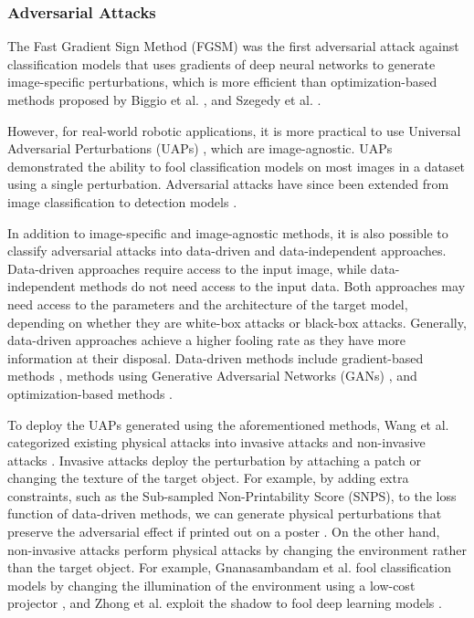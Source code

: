 \subsubsection{Adversarial Attacks}

 The Fast Gradient Sign Method (FGSM) \citep{GoodfellowSS14} was the first adversarial attack against classification models that uses gradients of deep neural networks to generate image-specific perturbations, which is more efficient than optimization-based methods proposed by Biggio et al. \citep{biggio2013evasion}, and Szegedy et al. \citep{szegedy2013intriguing}. 

However, for real-world robotic applications, it is more practical to use Universal Adversarial Perturbations (UAPs) \citep{moosavi2017universal, li2021universal, han2023driving}, which are image-agnostic. UAPs demonstrated the ability to fool classification models on most images in a dataset using a single perturbation. Adversarial attacks have since been extended from image classification to detection models \citep{gurbaxani2018traits, han2023detection}.

In addition to image-specific and image-agnostic methods, it is also possible to classify adversarial attacks into data-driven and data-independent approaches.  Data-driven approaches require access to the input image, while data-independent methods do not need access to the input data. Both approaches may need access to the parameters and the architecture of the target model, depending on whether they are white-box attacks or black-box attacks.  Generally, data-driven approaches achieve a higher fooling rate as they have more information at their disposal. Data-driven methods include gradient-based methods \citep{chow2020adversarial,li2021universal, xie2017adversarial, han2023detection}, methods using Generative Adversarial Networks (GANs) \citep{hashemi2020transferable,Wei2019}, and optimization-based methods \citep{carlini2017towards,liao2021transferable}. 

To deploy the UAPs generated using the aforementioned methods, Wang et al. categorized existing physical attacks into invasive attacks and
non-invasive attacks \citep{wang2022survey}. Invasive attacks deploy the perturbation by attaching a patch \citep{lee2019physical, xu2020adversarial, hu2021naturalistic, thys2019fooling} or changing the texture \citep{wang2021dual, wang2022fca} of the target object. For example, by adding extra constraints, such as the Sub-sampled Non-Printability Score (SNPS), to the loss function of data-driven methods, we can generate physical perturbations that preserve the adversarial effect if printed out on a poster \citep{lee2019physical}. On the other hand, non-invasive attacks perform physical attacks by changing the environment rather than the target object. For example, Gnanasambandam et al. fool classification models by changing the illumination of the environment using a low-cost projector \citep{gnanasambandam2021optical}, and Zhong et al. exploit the shadow to fool deep learning models \citep{zhong2022shadows}.

